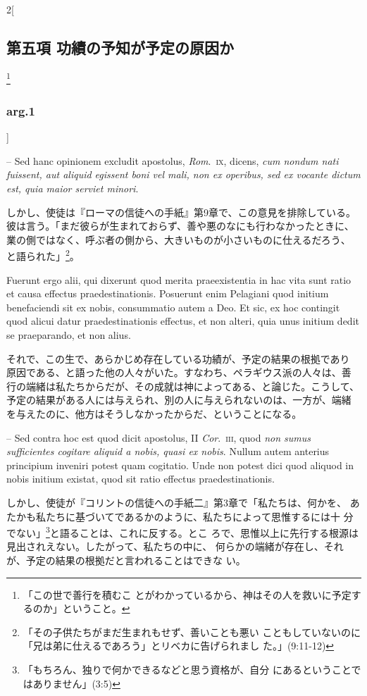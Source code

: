 \documentclass[paper=a4paper,fontsize=10pt,jafontsize=9pt,titlepage]{jlreq}
\begin{document}
\begin{paracol}{2}[\subsection{第五項 功績の予知が予定の原因か}\footnote{「この世で善行を積むこ とがわかっているから、神はその人を救いに予定するのか」ということ。}\subsubsection{arg.1}]
\switchcolumn*


-- Sed hanc opinionem excludit
apostolus, {\itshape Rom}.~{\scshape ix}, dicens, {\itshape cum nondum nati fuissent, aut aliquid
egissent boni vel mali, non ex operibus, sed ex vocante dictum est, quia
maior serviet minori}.


\switchcolumn


しかし、使徒は『ローマの信徒への手紙』第9章で、この意見を排除している。
彼は言う。「まだ彼らが生まれておらず、善や悪のなにも行わなかったときに、
業の側ではなく、呼ぶ者の側から、大きいものが小さいものに仕えるだろう、
と語られた」\footnote{「その子供たちがまだ生まれもせず、善いことも悪い
こともしていないのに「兄は弟に仕えるであろう」とリベカに告げられまし
た。」(9:11-12)}。


\switchcolumn*


Fuerunt ergo alii, qui dixerunt quod merita
praeexistentia in hac vita sunt ratio et causa effectus
praedestinationis. Posuerunt enim Pelagiani quod initium benefaciendi
sit ex nobis, consummatio autem a Deo. Et sic, ex hoc contingit quod
alicui datur praedestinationis effectus, et non alteri, quia unus
initium dedit se praeparando, et non alius.


\switchcolumn


それで、この生で、あらかじめ存在している功績が、予定の結果の根拠であり
原因である、と語った他の人々がいた。すなわち、ペラギウス派の人々は、善
行の端緒は私たちからだが、その成就は神によってある、と論じた。こうして、
予定の結果がある人には与えられ、別の人に与えられないのは、一方が、端緒
を与えたのに、他方はそうしなかったからだ、ということになる。


\switchcolumn*


-- Sed contra hoc est quod
dicit apostolus, II {\itshape Cor}.~{\scshape iii}, quod {\itshape non sumus sufficientes cogitare
aliquid a nobis, quasi ex nobis}. Nullum autem anterius principium
inveniri potest quam cogitatio. Unde non potest dici quod aliquod in
nobis initium existat, quod sit ratio effectus praedestinationis.


\switchcolumn


しかし、使徒が『コリントの信徒への手紙二』第3章で「私たちは、何かを、
あたかも私たちに基づいてであるかのように、私たちによって思惟するには十
分でない」\footnote{「もちろん、独りで何かできるなどと思う資格が、自分
にあるということではありません」(3:5)}と語ることは、これに反する。とこ
ろで、思惟以上に先行する根源は見出されえない。したがって、私たちの中に、
何らかの端緒が存在し、それが、予定の結果の根拠だと言われることはできな
い。



\end{paracol}
\end{document}
